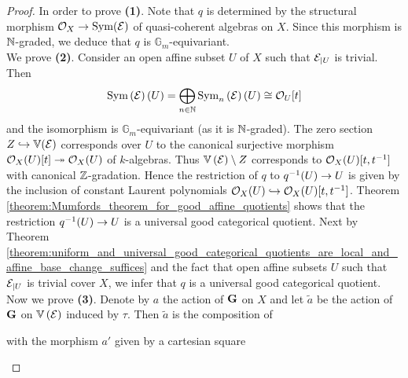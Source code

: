 \begin{proof}
In order to prove \textbf{(1)}. Note that $q$ is determined by the structural morphism $\cO_X\ra \Sym(\cE)$ of quasi-coherent algebras on $X$. Since this morphism is $\NN$-graded, we deduce that $q$ is $\mathbb{G}_m$-equivariant.\\
We prove \textbf{(2)}. Consider an open affine subset $U$ of $X$ such that $\cE_{\mid U}$ is trivial. Then 
$$\Sym\left(\cE\right)(U) = \bigoplus_{n\in \NN}\Sym_n\left(\cE\right)(U) \cong \cO_U[t]$$
and the isomorphism is $\mathbb{G}_m$-equivariant (as it is $\NN$-graded). The zero section $Z\hookrightarrow \mathbb{V}(\cE)$ corresponds over $U$ to the canonical surjective morphism $\cO_X(U)[t]\twoheadrightarrow \cO_X(U)$ of $k$-algebras. Thus $\mathbb{V}\left(\cE\right)\setminus Z$ corresponds to $\cO_X(U)[t,t^{-1}]$ with canonical $\ZZ$-gradation. Hence the restriction of $q$ to $q^{-1}(U)\ra U$ is given by the inclusion of constant Laurent polynomials $\cO_X(U)\hookrightarrow \cO_X(U)[t,t^{-1}]$. Theorem \ref{theorem:Mumfords_theorem_for_good_affine_quotients} shows that the restriction $q^{-1}(U)\ra U$ is a universal good categorical quotient. Next by Theorem \ref{theorem:uniform_and_universal_good_categorical_quotients_are_local_and_affine_base_change_suffices} and the fact that open affine subsets $U$ such that $\cE_{\mid U}$ is trivial cover $X$, we infer that $q$ is a universal good categorical quotient.\\
Now we prove \textbf{(3)}. Denote by $a$ the action of $\bd{G}$ on $X$ and let $\tilde{a}$ be the action of $\bd{G}$ on $\mathbb{V}\left(\cE\right)$ induced by $\tau$. Then $\tilde{a}$ is the composition of
\begin{center}
\end{center}
with the morphism $a'$ given by a cartesian square
\begin{center}
\begin{tikzpicture}

\end{tikzpicture}
\end{center}
\end{proof}
